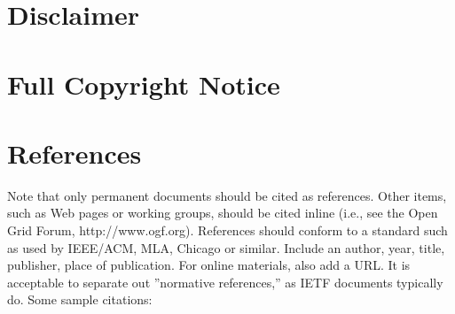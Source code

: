 \documentclass[10pt,a4paper,british]{article}
\begin{document}
\section{Disclaimer}


\section{Full Copyright Notice}


\section{References}

Note that only permanent documents should be cited as
references. Other items, such as Web pages or working groups, should
be cited inline (i.e., see the Open Grid Forum,
http://www.ogf.org). References should conform to a standard such as
used by IEEE/ACM, MLA, Chicago or similar. Include an author, year,
title, publisher, place of publication. For online materials, also add
a URL. It is acceptable to separate out ''normative references,'' as
IETF documents typically do. Some sample citations:
\end{document}
